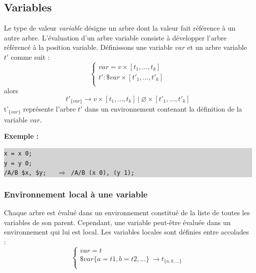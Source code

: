 \documentclass{article}
\newcommand{\exemple}	{\vspace*{2mm}\hspace*{-4mm}\textbf{Exemple :}}
\newcommand{\code}	[2][0.9]	{\vspace{0mm}\begin{center}\colorbox{lightgrey}{
							\begin{minipage}[t]{#1\columnwidth} 
							{\small \texttt{#2}}
							\end{minipage}}\end{center}}
\newcommand{\llist}	[1]		{\ensuremath{[#1_1,...,#1_k]}}
\newcommand{\seq}		{\ensuremath{|}}
\newcommand{\forest}	{\ensuremath{\varnothing}}
\newcommand{\etc}		{\ensuremath{\text{…}}}
\begin{document}
%
%
%
%
%


\subsection{Variables}

Le type de valeur \emph{variable} désigne un arbre dont la valeur fait référence à un autre arbre.
L'évaluation d'un arbre variable consiste à développer l'arbre référencé à la position variable.
Définissons une variable $var$ et un arbre variable $t'$ comme suit :
\[
\left\{
\begin{array}{l}
	var = v \times \llist{t} \\
	t' : \$var \times \llist{t'}\\
\end{array}
\right.
\]
alors 
\[
	t'_{\{var\}}  \to v \times \llist{t}\ \seq\ \forest \times \llist{t'}
\]
t'$_{\{var\}}$ représente l'arbre $t'$ dans un environnement contenant la définition de la variable $var$.


\exemple
\code{x = x 0;\\
y = y 0;\\
/A/B \$x, \$y; \ \ $\Rightarrow$  /A/B (x 0), (y 1);}


\subsubsection{Environnement local à une variable}

Chaque arbre est évalué dans un environnement constitué de la liste de toutes les variables de son parent. Cependant, une variable peut-être évaluée dans un environnement qui lui est local. Les variables locales sont définies entre accolades :
\[
\left\{
\begin{array}{l}
	var = t \\
	\$var\{a=t1, b=t2,\etc\} \ \to  t_{\{a, b,\etc\}} \\
\end{array}
\right.
\]
\end{document}

